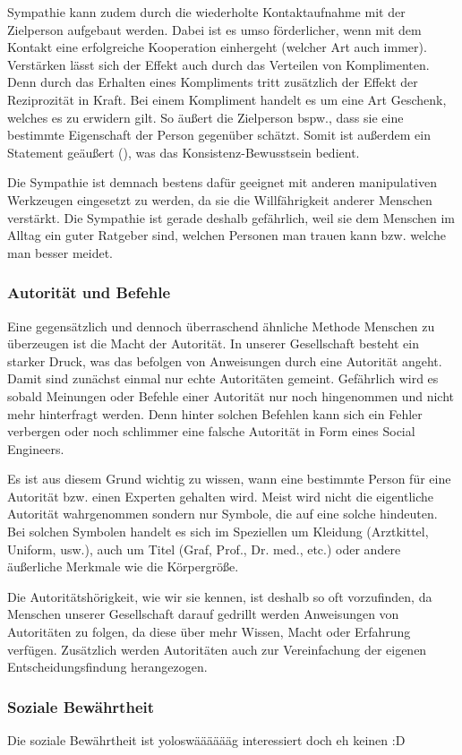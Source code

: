 Sympathie kann zudem durch die wiederholte Kontaktaufnahme mit der Zielperson aufgebaut werden. Dabei ist es umso förderlicher, wenn mit dem Kontakt eine erfolgreiche Kooperation einhergeht (welcher Art auch immer). Verstärken lässt sich der Effekt auch durch das Verteilen von Komplimenten. Denn durch das Erhalten eines Kompliments tritt zusätzlich der Effekt der Reziprozität in Kraft. Bei einem Kompliment handelt es um eine Art Geschenk, welches es zu erwidern gilt. So äußert die Zielperson bspw., dass sie eine bestimmte Eigenschaft der Person gegenüber schätzt. Somit ist außerdem ein Statement geäußert (), was das Konsistenz-Bewusstsein bedient.

Die Sympathie ist demnach bestens dafür geeignet mit anderen manipulativen Werkzeugen eingesetzt zu werden, da sie die Willfährigkeit anderer Menschen verstärkt. Die Sympathie ist gerade deshalb gefährlich, weil sie dem Menschen im Alltag ein guter Ratgeber sind, welchen Personen man trauen kann bzw. welche man besser meidet. \citep{cialdini}

\subsubsection{Autorität und Befehle}\label{sec:autorität-und-befehle}
Eine gegensätzlich und dennoch überraschend ähnliche Methode Menschen zu überzeugen ist die Macht der Autorität. In unserer Gesellschaft besteht ein starker Druck, was das befolgen von Anweisungen durch eine Autorität angeht. Damit sind zunächst einmal nur echte Autoritäten gemeint. Gefährlich wird es sobald Meinungen oder Befehle einer Autorität nur noch hingenommen und nicht mehr hinterfragt werden. Denn hinter solchen Befehlen kann sich ein Fehler verbergen oder noch schlimmer eine falsche Autorität in Form eines Social Engineers.

Es ist aus diesem Grund wichtig zu wissen, wann eine bestimmte Person für eine Autorität bzw. einen Experten gehalten wird. Meist wird nicht die eigentliche Autorität wahrgenommen sondern nur Symbole, die auf eine solche hindeuten. Bei solchen Symbolen handelt es sich im Speziellen um Kleidung (Arztkittel, Uniform, usw.), auch um Titel (Graf, Prof., Dr. med., etc.) oder andere äußerliche Merkmale wie die Körpergröße.

Die Autoritätshörigkeit, wie wir sie kennen, ist deshalb so oft vorzufinden, da Menschen unserer Gesellschaft darauf gedrillt werden Anweisungen von Autoritäten zu folgen, da diese über mehr Wissen, Macht oder Erfahrung verfügen. Zusätzlich werden Autoritäten auch zur Vereinfachung der eigenen Entscheidungsfindung herangezogen. \citep{cialdini}

\subsubsection{Soziale Bewährtheit}\label{sec:soziale-bewährtheit}
Die soziale Bewährtheit ist yoloswääääääg interessiert doch eh keinen :D
\citep{cialdini}

